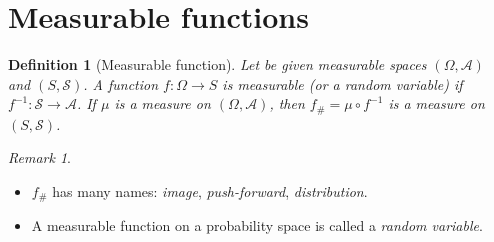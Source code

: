 \documentclass[12pt,a4paper]{amsart}
\theoremstyle{plain}
\newtheorem{definition}[theorem]{Definition}%
\theoremstyle{definition}
\theoremstyle{remark}
\newtheorem{remark}[theorem]{Remark}
\begin{document}
\section{Measurable functions}
\label{sec:measurable-functions}

\begin{definition}[Measurable function]
  Let be given measurable spaces $(\Omega,\mathcal A)$ and
  $(S,\mathcal S)$. A function $f \colon \Omega \to S$ is \emph{measurable}
  (or a \emph{random variable}) if $f^{-1} \colon \mathcal S \to
  \mathcal A$. If $\mu$ is a measure on $(\Omega,\mathcal A)$, then
  $f_\# = \mu \circ f^{-1}$ is a measure on $(S,\mathcal S)$.
\end{definition}

\begin{remark}\ 
\begin{itemize}
\item $f_\#$ has many names: \emph{image}, \emph{push-forward},   \emph{distribution}.
\item A measurable function on a probability space is called a
  \emph{random variable}.
\end{itemize}
\end{remark}
\end{document}
